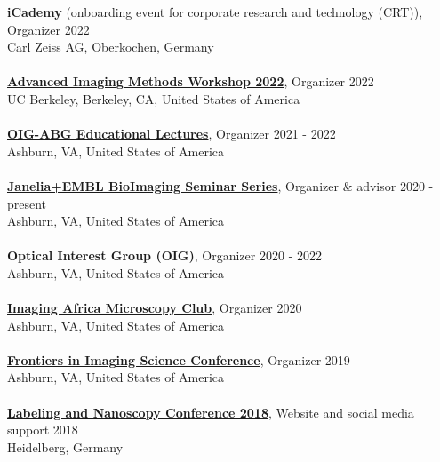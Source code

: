 \documentclass[margin,line]{res}
\begin{document}
\begin{resume}
{\bf iCademy} (onboarding event for corporate research and technology (CRT)), Organizer \hfill {2022}\\
Carl Zeiss AG, Oberkochen, Germany\\
\vspace*{-3mm}\\
{\bf \href{https://crl.berkeley.edu/molecular-imaging-center/meetings-and-short-courses/}{Advanced Imaging Methods Workshop 2022}}, Organizer \hfill {2022}\\
UC Berkeley, Berkeley, CA, United States of America\\
\vspace*{-3mm}\\
{\bf \href{https://www.janelia.org/content/optical-interest-group}{OIG-ABG Educational Lectures}}, Organizer \hfill {2021 - 2022}\\
Ashburn, VA, United States of America\\
\vspace*{-3mm}\\
{\bf \href{https://www.janelia.org/node/65736}{Janelia+EMBL BioImaging Seminar Series}}, Organizer \& advisor \hfill {2020 - present}\\
Ashburn, VA, United States of America\\
\vspace*{-3mm}\\
{\bf Optical Interest Group (OIG)}, Organizer \hfill {2020 - 2022}\\
Ashburn, VA, United States of America\\
\vspace*{-3mm}\\
{\bf \href{https://www.imagingafrica.org/}{Imaging Africa Microscopy Club}}, Organizer \hfill {2020}\\
Ashburn, VA, United States of America\\
\vspace*{-3mm}\\
{\bf \href{https://www.janelia.org/you-janelia/conferences/frontiers-in-imaging-science-ii}{ Frontiers in Imaging Science Conference}}, Organizer \hfill {2019}\\
Ashburn, VA, United States of America\\
\vspace*{-3mm}\\
{\bf \href{https://labeling-and-nanoscopy.de/}{Labeling and Nanoscopy Conference 2018}}, Website and social media support \hfill {2018}\\
Heidelberg, Germany\\

\end{resume}
\end{document}
